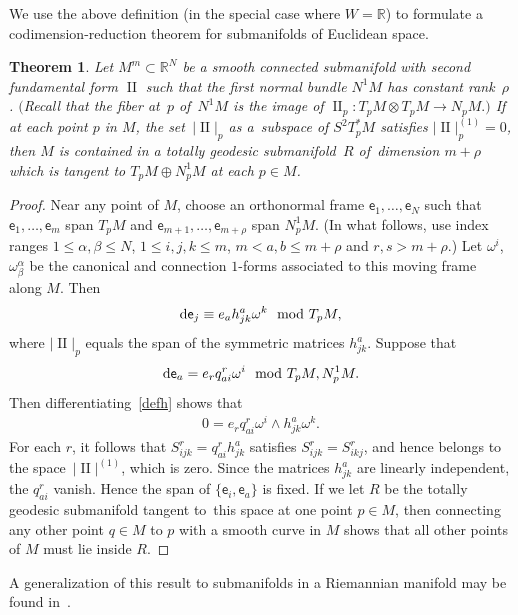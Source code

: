 \documentclass[pdftex]{sigma}
\def\R{\mathbb{R}}
\def\ve{\mathsf{e}}
\def\II{\operatorname{II}} %
\newtheorem{Theorem}{Theorem}[section]
\numberwithin{equation}{section}
\begin{document}
We use the above definition (in the special case where $W=\R$) to formulate a codimension-reduction theorem for submanifolds of Euclidean space.

\begin{Theorem} \label{codim-reduction-thm}
Let $M^m \subset \R^N$ be a smooth connected submanifold with second fundamental form $\II$ such that the first normal bundle $N^1 M$ has constant rank~$\rho$. $($Recall that the fiber at~$p$ of~$N^1 M$ is the image of $\II_p\colon T_p M \otimes T_p M \to N_p M.)$ If at each point $p$ in $M$, the set~$|\II|_p$ as a~subspace of $S^2 T_p^* M$ satisfies $|\II|_p^{(1)}=0$, then $M$ is contained in a totally geodesic submanifold~$R$ of~dimension $m+\rho$ which is tangent to $T_p M \oplus N^1_p M$ at each $p \in M$.
\end{Theorem}
\begin{proof}
Near any point of $M$, choose an orthonormal frame $\ve_1, \dots, \ve_N$ such that $\ve_1, \dots, \ve_m$ span $T_p M$ and $\ve_{m+1}, \dots, \ve_{m+\rho}$ span $N^1_p M$. (In what follows, use index ranges $1 \le \alpha, \beta \le N$, $1\le i,j,k \le m$, $m< a,b \le m+\rho$ and $r,s > m+\rho$.) Let $\omega^i$, $\omega^\alpha_\beta$ be the canonical and connection $1$-forms associated to this moving frame along $M$. Then
\begin{gather} \label{defh}
{\rm d}\ve_j \equiv e_a h^a_{jk} \omega^k \mod T_p M,
\end{gather}
where $|\II|_p$ equals the span of the symmetric matrices $h^a_{jk}$. Suppose that
\begin{gather*}
{\rm d}\ve_a = e_r q^r_{ai} \omega^i	\mod T_pM, N^1_p M.
\end{gather*}
Then differentiating~\eqref{defh} shows that
\begin{gather*}
0 = e_r q^r_{ai} \omega^i \wedge h^a_{jk} \omega^k.
\end{gather*}
For each $r$, it follows that $S^r_{ijk} = q^r_{ai} h^a_{jk}$ satisfies $S^r_{ijk} = S^r_{ikj}$, and hence belongs to the space~$|\II|^{(1)}$, which is zero. Since the matrices $h^a_{jk}$ are linearly independent, the $q^r_{ai}$ vanish. Hence the span of $\{ \ve_i, \ve_a\}$ is fixed. If we let $R$ be the totally geodesic submanifold tangent to~this space at one point $p \in M$, then connecting any other point $q\in M$ to $p$ with a smooth curve in $M$ shows that all other points of $M$ must lie inside $R$.
\end{proof}

A generalization of this result to submanifolds in a Riemannian manifold may be found in~\cite[Section~4.2]{BY}.
\end{document}
